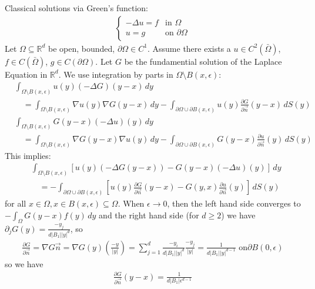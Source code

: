 \documentclass{report}
\theoremstyle{tommy}
\begin{document}
  Classical solutions via Green's function:
  \begin{align*}
    \begin{cases}
      - \Delta u = f & \text{in } \Omega \\ u = g & \text{on } \partial \Omega
    \end{cases}
  \end{align*}
  Let \(\Omega \subseteq \mathbb{R}^d\) be open, bounded, \(\partial \Omega \in C^1\). Assume there exists a \(u \in C^2(\bar \Omega)\), \(f \in C(\bar \Omega)\), \(g \in C(\partial \Omega)\). Let \(G\) be the fundamential solution of the Laplace Equation in \(\mathbb{R}^d\). We use integration by parts in \(\Omega \setminus B(x, \epsilon)\):
  \begin{align*}
    &\int_{\Omega \setminus B(x, \epsilon)} u(y)(-\Delta G)(y-x) \, dy \\
    &\quad= \int_{\Omega \setminus B(x, \epsilon)} \nabla u(y) \nabla G(y-x) \, dy - \int_{\partial \Omega \cup \partial B(x, \epsilon)} u(y) \frac{\partial G}{\partial \vec{n}} (y-x) \, dS(y) \\
    &\int_{\Omega \setminus B(x, \epsilon)} G(y-x)(-\Delta u)(y) \, dy \\
    &\quad= \int_{\Omega \setminus B(x,\epsilon)} \nabla G(y-x)\nabla u(y) \, dy - \int_{\partial \Omega \cup \partial B(x,\epsilon)}G(y-x) \frac{\partial u}{\partial \vec{n}}(y) \, dS(y)
  \end{align*}
  This implies:
  \begin{align*}
    &\int_{\Omega \setminus B(x,\epsilon)} \left[u(y) (-\Delta G(y-x))-G(y-x)(-\Delta u)(y)\right] \, dy  \\
    &\quad= - \int_{\partial \Omega \cup \partial B(x, \epsilon)} \left[u(y) \frac{\partial G}{\partial \vec{n}}(y-x) - G(y,x) \frac{\partial u}{\partial \vec{n}}(y)\right] \, dS(y)
  \end{align*}
  for all \(x \in \Omega, x \in B(x, \epsilon) \subseteq \Omega\). When \(\epsilon \to 0\), then the left hand side converges to \(- \int_\Omega G(y-x) f(y) \, dy\) and the right hand side (for \(d \ge 2\)) we have \(\partial_j G(y) = \frac{-y_j}{d|B_1||y|^d}\), so
  \begin{align*}
    \frac{\partial G}{\partial \vec{n}}
    = \nabla G \vec{n} 
    = \nabla G(y) \left(\frac{-y}{|y|}\right)
    = \sum_{j=1}^d \frac{-y_i}{d|B_1||y|^d} \frac{-y_j}{|y|}
    = \frac{1}{d|B_1||y|^{d-1}} \text{ on} \partial B(0, \epsilon)
  \end{align*}
  so we have 
  \begin{align*}
    \frac{\partial G}{\partial \vec{n}}(y-x) = \frac{1}{d|B_1| \epsilon^{d-1}}
  \end{align*}
\end{document}
